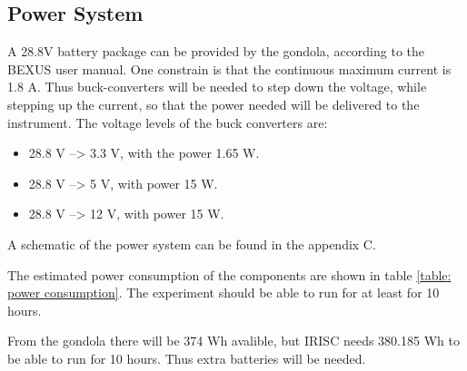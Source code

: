 \pagebreak
\subsection{Power System}
A 28.8V battery package can be provided by the gondola, according to the BEXUS user manual. One constrain is that the continuous maximum current is 1.8 A. Thus buck-converters will be needed to step down the voltage, while stepping up the current, so that the power needed will be delivered to the instrument. The voltage levels of the buck converters are: 

\begin{itemize}
	\item 28.8 V --> 3.3 V, with the power 1.65 W.
	\item 28.8 V --> 5 V, with power 15 W.
	\item 28.8 V --> 12 V, with power 15 W.
\end{itemize}

A schematic of the power system can be found in the appendix C.

The estimated power consumption of the components are shown in table \ref{table: power consumption}. The experiment should be able to run for at least for 10 hours. 


From the gondola there will be 374 Wh avalible, but IRISC needs 380.185 Wh to be able to run for 10 hours. Thus extra batteries will be needed. 




\raggedbottom
